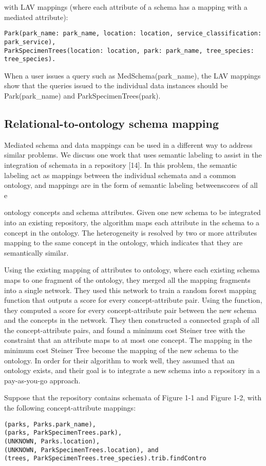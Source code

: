 with LAV mappings (where each attribute of a schema has a mapping with a mediated attribute):
\begin{lstlisting}
Park(park_name: park_name, location: location, service_classification: park_service),
ParkSpecimenTrees(location: location, park: park_name, tree_species: tree_species).
\end{lstlisting}
When a user issues a query such as MedSchema(park\_name), the LAV mappings show that the queries issued to the individual data instances should be Park(park\_name) and ParkSpecimenTrees(park).

\subsection{Relational-to-ontology schema mapping}

Mediated schema and data mappings can be used in a different way to address similar problems. We discuss one work that uses semantic labeling to assist in the integration of schemata in a repository [14]. In this problem, the semantic labeling act as mappings between the individual schemata and a common ontology, and mappings are in the form of semantic labeling betweenscores of all e

ontology concepts and schema attributes. Given one new schema to be integrated into an existing repository, the algorithm maps each attribute in the schema to a concept in the ontology. The heterogeneity is resolved by two or more attributes mapping to the same concept in the ontology, which indicates that they are semantically similar.

Using the existing mapping of attributes to ontology, where each existing schema maps to one fragment of the ontology, they merged all the mapping fragments into a single network. They used this network to train a random forest mapping function that outputs a score for every concept-attribute pair. Using the function, they computed a score for every concept-attribute pair between the new schema and the concepts in the network. They then constructed a connected graph of all the concept-attribute pairs, and found a minimum cost Steiner tree with the constraint that an attribute maps to at most one concept. The mapping in the minimum cost Steiner Tree become the mapping of the new schema to the ontology. In order for their algorithm to work well, they assumed that an ontology exists, and their goal is to integrate a new schema into a repository in a pay-as-you-go approach.

Suppose that the repository contains schemata of Figure 1-1 and Figure 1-2, with the following concept-attribute mappings:
\begin{lstlisting}
(parks, Parks.park_name),
(parks, ParkSpecimenTrees.park),
(UNKNOWN, Parks.location),
(UNKNOWN, ParkSpecimenTrees.location), and
(trees, ParkSpecimenTrees.tree_species).trib.findContro
\end{lstlisting}

